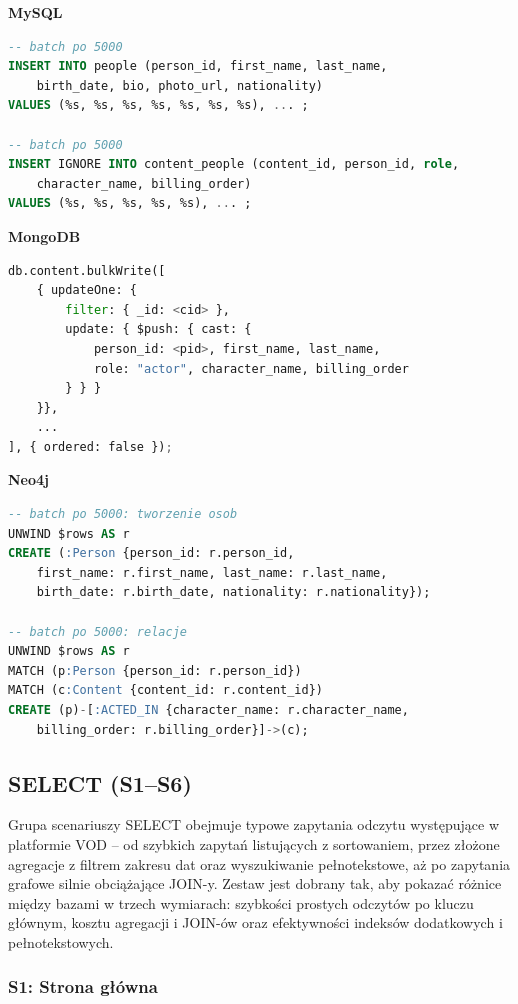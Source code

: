 \textbf{MySQL}
\begin{lstlisting}[language=SQL]
-- batch po 5000
INSERT INTO people (person_id, first_name, last_name,
    birth_date, bio, photo_url, nationality)
VALUES (%s, %s, %s, %s, %s, %s, %s), ... ;

-- batch po 5000
INSERT IGNORE INTO content_people (content_id, person_id, role,
    character_name, billing_order)
VALUES (%s, %s, %s, %s, %s), ... ;
\end{lstlisting}

\textbf{MongoDB}
\begin{lstlisting}[language=Python]
db.content.bulkWrite([
    { updateOne: {
        filter: { _id: <cid> },
        update: { $push: { cast: {
            person_id: <pid>, first_name, last_name,
            role: "actor", character_name, billing_order
        } } }
    }},
    ...
], { ordered: false });
\end{lstlisting}

\textbf{Neo4j}
\begin{lstlisting}[language=SQL]
-- batch po 5000: tworzenie osob
UNWIND $rows AS r
CREATE (:Person {person_id: r.person_id,
    first_name: r.first_name, last_name: r.last_name,
    birth_date: r.birth_date, nationality: r.nationality});

-- batch po 5000: relacje
UNWIND $rows AS r
MATCH (p:Person {person_id: r.person_id})
MATCH (c:Content {content_id: r.content_id})
CREATE (p)-[:ACTED_IN {character_name: r.character_name,
    billing_order: r.billing_order}]->(c);
\end{lstlisting}


\subsection{SELECT (S1--S6)}

Grupa scenariuszy SELECT obejmuje typowe zapytania odczytu występujące w platformie
VOD -- od szybkich zapytań listujących z sortowaniem, przez złożone agregacje 
z filtrem zakresu dat oraz  wyszukiwanie pełnotekstowe, aż po zapytania grafowe
silnie obciążające JOIN-y. Zestaw jest dobrany tak, aby pokazać
różnice między bazami w trzech wymiarach: szybkości prostych odczytów po kluczu
głównym, kosztu agregacji i JOIN-ów oraz efektywności indeksów dodatkowych i pełnotekstowych.

\subsubsection{S1: Strona główna}

